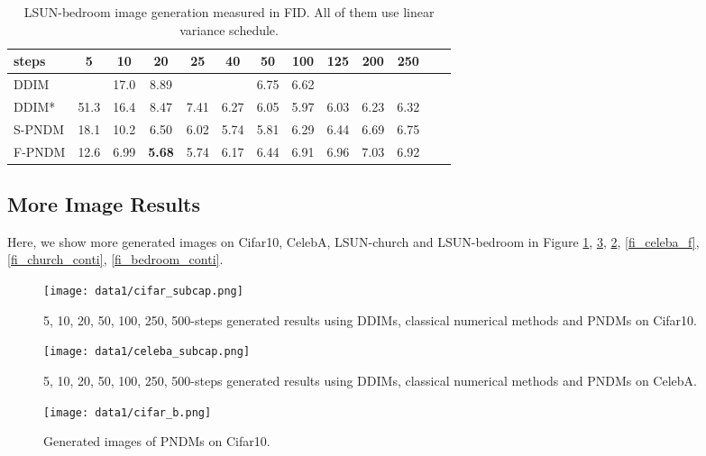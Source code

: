 \documentclass{article}
\begin{document}
\begin{table}[htbp]
   \begin{center}
      \begin{tabular}{l|c c c c c c c c c c c c}
         \toprule
         steps  & 5 & 10 & 20 & 25 & 40 & 50 & 100 & 125 & 200 & 250 \\
         \midrule
         DDIM      & & 17.0 & 8.89 & & & 6.75 & 6.62\\
         DDIM*     & 51.3 & 16.4 & 8.47 & 7.41 & 6.27 & 6.05 & 5.97 & 6.03 & 6.23 & 6.32 \\
         S-PNDM    & 18.1 & 10.2 & 6.50 & 6.02 & 5.74 & 5.81 & 6.29 & 6.44 & 6.69 & 6.75 \\
         F-PNDM    & 12.6 & 6.99 & \textbf{5.68} & 5.74 & 6.17 & 6.44 & 6.91 & 6.96 & 7.03 & 6.92\\
         \bottomrule
      \end{tabular}
   \end{center}
   \caption{LSUN-bedroom image generation measured in FID. All of them use linear variance schedule.}
   \label{tb-bedroom}
\end{table} 


\subsection{More Image Results}
\label{gen_results}

Here, we show more generated images on Cifar10, CelebA, LSUN-church and LSUN-bedroom in Figure \ref{fi_cifar_conti}, \ref{fi_cifar_f}, \ref{fi_celeba_conti}, \ref{fi_celeba_f}, \ref{fi_church_conti}, \ref{fi_bedroom_conti}.

\begin{figure}[!htbp]
   \centering
   \texttt{[image: data1/cifar\_subcap.png]}
   \caption{5, 10, 20, 50, 100, 250, 500-steps generated results using DDIMs, classical numerical methods and PNDMs on Cifar10.}
   \label{fi_cifar_conti}
\end{figure}

\begin{figure}[!htbp]
   \centering
   \texttt{[image: data1/celeba\_subcap.png]}
   \caption{5, 10, 20, 50, 100, 250, 500-steps generated results using DDIMs, classical numerical methods and PNDMs on CelebA.}
   \label{fi_celeba_conti}
\end{figure}


\begin{figure}[htbp]
   \centering
   \texttt{[image: data1/cifar\_b.png]}
   \caption{Generated images of PNDMs on Cifar10.}
   \label{fi_cifar_f}
\end{figure}
\end{document}
